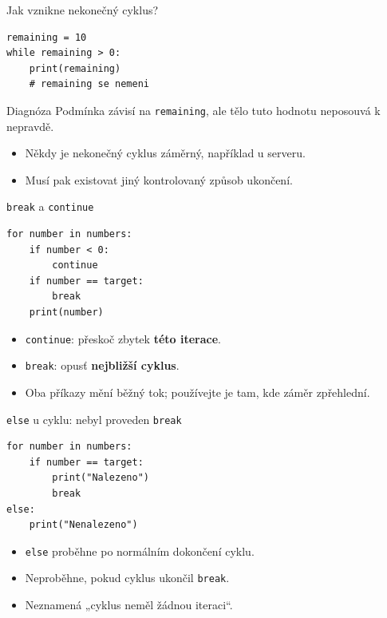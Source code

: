 \documentclass[aspectratio=169,t]{beamer}
\begin{document}
\begin{frame}[fragile]{Jak vznikne nekonečný cyklus?}
\begin{lstlisting}[style=python]
remaining = 10
while remaining > 0:
    print(remaining)
    # remaining se nemeni
\end{lstlisting}
  \begin{alertblock}{Diagnóza}
    Podmínka závisí na \texttt{remaining}, ale tělo tuto hodnotu neposouvá k nepravdě.
  \end{alertblock}
  \begin{itemize}
    \item Někdy je nekonečný cyklus záměrný, například u serveru.
    \item Musí pak existovat jiný kontrolovaný způsob ukončení.
  \end{itemize}
\end{frame}

\begin{frame}[fragile]{\texttt{break} a \texttt{continue}}
\begin{lstlisting}[style=python]
for number in numbers:
    if number < 0:
        continue
    if number == target:
        break
    print(number)
\end{lstlisting}
  \begin{itemize}
    \item \texttt{continue}: přeskoč zbytek \textbf{této iterace}.
    \item \texttt{break}: opusť \textbf{nejbližší cyklus}.
    \item Oba příkazy mění běžný tok; používejte je tam, kde záměr zpřehlední.
  \end{itemize}
\end{frame}

\begin{frame}[fragile]{\texttt{else} u cyklu: nebyl proveden \texttt{break}}
\begin{lstlisting}[style=python]
for number in numbers:
    if number == target:
        print("Nalezeno")
        break
else:
    print("Nenalezeno")
\end{lstlisting}
  \begin{itemize}
    \item \texttt{else} proběhne po normálním dokončení cyklu.
    \item Neproběhne, pokud cyklus ukončil \texttt{break}.
    \item Neznamená „cyklus neměl žádnou iteraci“.
  \end{itemize}
\end{frame}
\end{document}
